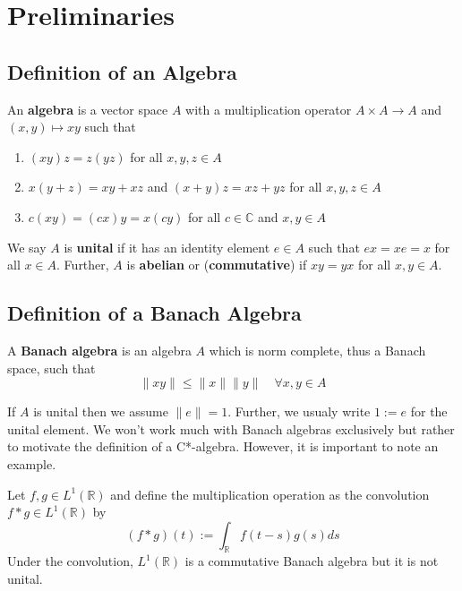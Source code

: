 \section{Preliminaries}
\label{sec:prelim}
\subsection{Definition of an Algebra}
\begin{definition}
    An \textbf{algebra} is a vector space $A$ with a multiplication operator
    $A \times A \to A$ and $(x,y) \mapsto xy$ such that
    \begin{enumerate}
        \item $(xy)z = z(yz)$ for all $x,y,z \in A$
        \item $x(y+z) = xy + xz$ and $(x+y)z = xz+yz$ for all $x,y,z \in A$
        \item $c(xy) = (cx)y = x(cy)$ for all $c \in \mathbb{C}$ and $x,y \in A$
    \end{enumerate}
\end{definition}
We say $A$ is \textbf{unital} if it has an identity element $e \in A$ such that
$ex = xe = x$ for all $x \in A$. Further, $A$ is \textbf{abelian} or (\textbf{commutative})
if $xy=yx$ for all $x,y \in A$.

\subsection{Definition of a Banach Algebra}
\begin{definition}
    A \textbf{Banach algebra} is an algebra $A$ which is norm complete, thus a Banach
    space, such that
    \begin{equation*}
        \| xy \| \le \|x\| \|y\| \quad \forall x,y \in A
    \end{equation*}
\end{definition}
If $A$ is unital then we assume $\| e \| = 1$. Further, we usualy write $1:=e$ for
the unital element. We won't work much with Banach algebras exclusively but rather
to motivate the definition of a C*-algebra. However, it is important to note an example.
\begin{example}
    Let $f,g \in L^1(\mathbb{R})$ and define the multiplication operation as the convolution
    $f * g \in L^1 (\mathbb{R})$ by
    \begin{equation*}
        (f * g)(t) := \int_{\mathbb{R}} f(t-s)g(s)ds
    \end{equation*}
    Under the convolution, $L^1 (\mathbb{R})$ is a commutative Banach algebra but
    it is not unital.
\end{example}



